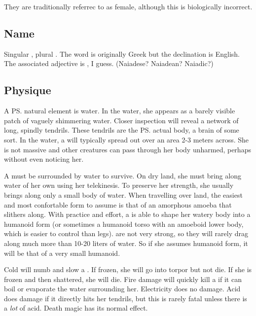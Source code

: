 They are traditionally referrec to as female, although this is biologically incorrect. 









\subsection{Name}
Singular \naiad, plural \emph{\naiads{}}. The word is originally Greek but the declination is English. The associated adjective is \emph{\naiad{}}, I guess. (Naiadese? Naiadean? Naiadic?) 









\subsection{Physique}
A \ps{\naiad}{} natural element is water. In the water, she appears as a barely visible patch of vaguely shimmering water. Closer inspection will reveal a network of long, spindly tendrils. These tendrils are the \ps{\naiad}{} actual body, a brain of some sort. In the water, a \naiad{} will typically spread out over an area 2-3 meters across. She is not massive and other creatures can pass through her body unharmed, perhaps without even noticing her. 

A \naiad{} must be surrounded by water to survive. On dry land, she must bring along water of her own using her telekinesis. To preserve her strength, she usually brings along only a small body of water. When travelling over land, the easiest and most confortable form to assume is that of an amorphous amoeba that slithers along. With practice and effort, a \naiad{} is able to shape her watery body into a humanoid form (or sometimes a humanoid torso with an amoeboid lower body, which is easier to control than legs). \Naiads{} are not very strong, so they will rarely drag along much more than 10-20 liters of water. So if she assumes humanoid form, it will be that of a very small humanoid. 

Cold will numb and slow a \naiad{}. If frozen, she will go into torpor but not die. If she is frozen and then shattered, she will die. Fire damage will quickly kill a \naiad{} if it can boil or evaporate the water surrounding her. Electricity does no damage. Acid does damage if it directly hits her tendrils, but this is rarely fatal unless there is a \emph{lot} of acid. Death magic has its normal effect. 









